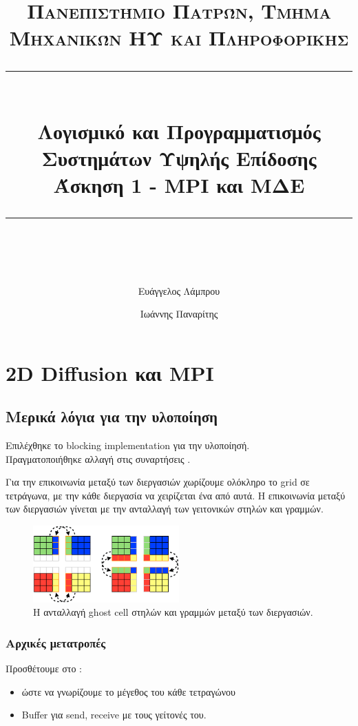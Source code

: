 \documentclass[11pt]{scrartcl} %
\title{	
	\normalfont\normalsize
	\textsc{Πανεπιστήμιο Πατρών, Τμήμα Μηχανικών ΗΥ και Πληροφορικής}\\ %
	\vspace{25pt} %
	\rule{\linewidth}{0.5pt}\\ %
	\vspace{20pt} %
	{\LARGE Λογισμικό και Προγραμματισμός Συστημάτων Υψηλής Επίδοσης\\ Άσκηση 1 - MPI και ΜΔΕ}\\ %
	\vspace{12pt} %
	\rule{\linewidth}{2pt}\\ %
	\vspace{12pt} %
}
\author{Ευάγγελος Λάμπρου \and Ιωάννης Παναρίτης} %
\date{} %
\begin{document}
\maketitle 

\section{2D Diffusion και MPI}

    \subsection*{Μερικά λόγια για την υλοποίηση}
        Επιλέχθηκε το blocking implementation για την υλοποίησή.\\
        Πραγματοποιήθηκε αλλαγή στις συναρτήσεις .

        Για την επικοινωνία μεταξύ των διεργασιών χωρίζουμε ολόκληρο το grid σε τετράγωνα, με την κάθε διεργασία να χειρίζεται ένα από αυτά.
        Η επικοινωνία μεταξύ των διεργασιών γίνεται με την ανταλλαγή των γειτονικών στηλών και γραμμών. \cite{ghostcellpattern}

        \begin{figure}[htpb]
            \centering
            \includegraphics[width=0.5\textwidth]{./assets/ghostcells.png}
            \caption{Η ανταλλαγή ghost cell στηλών και γραμμών μεταξύ των διεργασιών.}
        \end{figure}
        
        \subsubsection*{Αρχικές μετατροπές}
            Προσθέτουμε στο :
            \begin{itemize}
                \item {} ώστε να γνωρίζουμε το μέγεθος του κάθε τετραγώνου
                \item Buffer για send, receive με τους γείτονές του.
            \end{itemize}
            
\end{document}
